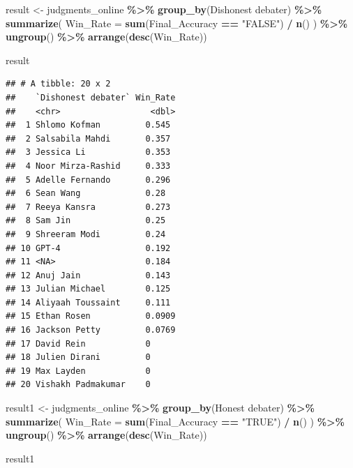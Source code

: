 \documentclass[
]{article}
\newenvironment{Shaded}{\begin{snugshade}}{\end{snugshade}}
\newcommand{\AttributeTok}[1]{\textcolor[rgb]{0.13,0.29,0.53}{#1}}
\newcommand{\FunctionTok}[1]{\textcolor[rgb]{0.13,0.29,0.53}{\textbf{#1}}}
\newcommand{\NormalTok}[1]{#1}
\newcommand{\OtherTok}[1]{\textcolor[rgb]{0.56,0.35,0.01}{#1}}
\newcommand{\SpecialCharTok}[1]{\textcolor[rgb]{0.81,0.36,0.00}{\textbf{#1}}}
\newcommand{\StringTok}[1]{\textcolor[rgb]{0.31,0.60,0.02}{#1}}
\begin{document}
\begin{Shaded}
\begin{Highlighting}[]
\NormalTok{result }\OtherTok{\textless{}{-}}\NormalTok{ judgments\_online }\SpecialCharTok{\%\textgreater{}\%}
  \FunctionTok{group\_by}\NormalTok{(}\StringTok{\textasciigrave{}}\AttributeTok{Dishonest debater}\StringTok{\textasciigrave{}}\NormalTok{) }\SpecialCharTok{\%\textgreater{}\%}
  \FunctionTok{summarize}\NormalTok{(}
    \AttributeTok{Win\_Rate =} \FunctionTok{sum}\NormalTok{(Final\_Accuracy }\SpecialCharTok{==} \StringTok{"FALSE"}\NormalTok{) }\SpecialCharTok{/} \FunctionTok{n}\NormalTok{()}
\NormalTok{  ) }\SpecialCharTok{\%\textgreater{}\%}
  \FunctionTok{ungroup}\NormalTok{() }\SpecialCharTok{\%\textgreater{}\%}
  \FunctionTok{arrange}\NormalTok{(}\FunctionTok{desc}\NormalTok{(Win\_Rate))}

\NormalTok{result}
\end{Highlighting}
\end{Shaded}

\begin{verbatim}
## # A tibble: 20 x 2
##    `Dishonest debater` Win_Rate
##    <chr>                  <dbl>
##  1 Shlomo Kofman         0.545 
##  2 Salsabila Mahdi       0.357 
##  3 Jessica Li            0.353 
##  4 Noor Mirza-Rashid     0.333 
##  5 Adelle Fernando       0.296 
##  6 Sean Wang             0.28  
##  7 Reeya Kansra          0.273 
##  8 Sam Jin               0.25  
##  9 Shreeram Modi         0.24  
## 10 GPT-4                 0.192 
## 11 <NA>                  0.184 
## 12 Anuj Jain             0.143 
## 13 Julian Michael        0.125 
## 14 Aliyaah Toussaint     0.111 
## 15 Ethan Rosen           0.0909
## 16 Jackson Petty         0.0769
## 17 David Rein            0     
## 18 Julien Dirani         0     
## 19 Max Layden            0     
## 20 Vishakh Padmakumar    0
\end{verbatim}

\begin{Shaded}
\begin{Highlighting}[]
\NormalTok{result1 }\OtherTok{\textless{}{-}}\NormalTok{ judgments\_online }\SpecialCharTok{\%\textgreater{}\%}
  \FunctionTok{group\_by}\NormalTok{(}\StringTok{\textasciigrave{}}\AttributeTok{Honest debater}\StringTok{\textasciigrave{}}\NormalTok{) }\SpecialCharTok{\%\textgreater{}\%}
  \FunctionTok{summarize}\NormalTok{(}
    \AttributeTok{Win\_Rate =} \FunctionTok{sum}\NormalTok{(Final\_Accuracy }\SpecialCharTok{==} \StringTok{"TRUE"}\NormalTok{) }\SpecialCharTok{/} \FunctionTok{n}\NormalTok{()}
\NormalTok{  ) }\SpecialCharTok{\%\textgreater{}\%}
  \FunctionTok{ungroup}\NormalTok{() }\SpecialCharTok{\%\textgreater{}\%}
  \FunctionTok{arrange}\NormalTok{(}\FunctionTok{desc}\NormalTok{(Win\_Rate))}

\NormalTok{result1}
\end{Highlighting}
\end{Shaded}
\end{document}
